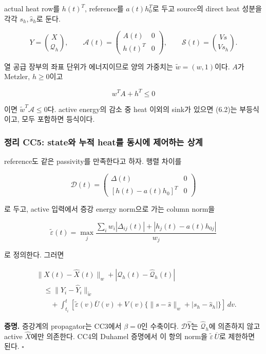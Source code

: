 \documentclass[11pt,a4paper]{article}
\begin{document}
actual heat row를 \(h(t)^T\), reference를 \(a(t)h_0^T\)로 두고 source의 direct heat 성분을 각각 \(s_h,\widehat s_h\)로 둔다.

\[
Y=\binom{X}{\mathcal Q_h},\qquad
\mathcal A(t)=
\begin{pmatrix}A(t)&0\\h(t)^T&0\end{pmatrix},
\qquad
\mathcal S(t)=\binom{Vs}{Vs_h}.
\tag{6.1}
\]

열 공급 장부의 좌표 단위가 에너지이므로 양의 가중치는 \(\widetilde w=(w,1)\)이다. \(A\)가 Metzler, \(h\ge0\)이고

\[
w^TA+h^T\le0
\tag{6.2}
\]

이면 \(\widetilde w^T\mathcal A\le0\)다. active energy의 감소 중 heat 이외의 sink가 있으면 (6.2)는 부등식이고, 모두 포함하면 등식이다.

\hypertarget{uxc815uxb9ac-cc5-stateuxc640-uxb204uxc801-heatuxb97c-uxb3d9uxc2dcuxc5d0-uxc81cuxc5b4uxd558uxb294-uxc0c1uxacc4}{%
\subsubsection{정리 CC5: state와 누적 heat를 동시에 제어하는 상계}\label{uxc815uxb9ac-cc5-stateuxc640-uxb204uxc801-heatuxb97c-uxb3d9uxc2dcuxc5d0-uxc81cuxc5b4uxd558uxb294-uxc0c1uxacc4}}

reference도 같은 passivity를 만족한다고 하자. 행렬 차이를

\[
\mathcal D(t)=
\begin{pmatrix}
\Delta(t)&0\\
[h(t)-a(t)h_0]^T&0
\end{pmatrix}
\tag{6.3}
\]

로 두고, active 입력에서 증강 energy norm으로 가는 column norm을

\[
\widetilde\varepsilon(t)=
\max_j\frac{\sum_iw_i|\Delta_{ij}(t)|
+|h_j(t)-a(t)h_{0j}|}{w_j}
\tag{6.4}
\]

로 정의한다. 그러면

\[
\boxed{
\begin{aligned}
&\|X(t)-\widehat X(t)\|_w
+|\mathcal Q_h(t)-\widehat{\mathcal Q}_h(t)|\\
&\quad\le
\|Y_i-\widehat Y_i\|_{\widetilde w}\\
&\qquad+
\int_{t_i}^{t}
\left[\widetilde\varepsilon(v)\overline U(v)
+V(v)\{\|s-\widehat s\|_w+|s_h-\widehat s_h|\}\right]\,dv.
\end{aligned}
}
\tag{6.5}
\]

\textbf{증명.} 증강계의 propagator는 CC3에서 \(\beta=0\)인 수축이다. \(\mathcal D\widehat Y\)는 \(\widehat{\mathcal Q}_h\)에 의존하지 않고 active \(\widehat X\)에만 의존한다. CC4의 Duhamel 증명에서 이 항의 norm을 \(\widetilde\varepsilon\,\overline U\)로 제한하면 된다. \(\square\)
\end{document}
